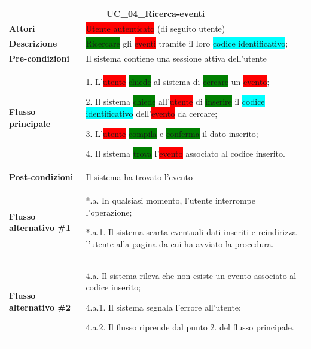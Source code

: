 \documentclass[11pt]{article}
\begin{document}
\begin{table}[H]
\centering
\begin{tabularx}{1\textwidth}{|l|X|}
\hline
\multicolumn{2}{|c|}{\textbf{UC\_04\_Ricerca-eventi}}\\
\hline \textbf{Attori} & \colorbox{red}{Utente autenticato} (di seguito utente)\\
\hline \textbf{Descrizione} & \colorbox{green}{Ricercare} gli \colorbox{red}{eventi} tramite il loro \colorbox{cyan}{codice identificativo};\\
\hline \textbf{Pre-condizioni} & Il sistema contiene una sessione attiva dell'utente\\
\hline \textbf{Flusso principale} & 
1. L'\colorbox{red}{utente} \colorbox{green}{chiede} al sistema di \colorbox{green}{cercare} un \colorbox{red}{evento};

2. Il sistema \colorbox{green}{chiede} all'\colorbox{red}{utente} di \colorbox{green}{inserire} il \colorbox{cyan}{codice identificativo} dell'\colorbox{red}{evento} da cercare;

3. L'\colorbox{red}{utente} \colorbox{green}{compila} e \colorbox{green}{conferma} il dato inserito;

4. Il sistema \colorbox{green}{trova} l'\colorbox{red}{evento} associato al codice inserito.
\\
\hline \textbf{Post-condizioni} & Il sistema ha trovato l'evento\\
\hline \textbf{Flusso alternativo \#1} & 
*.a. In qualsiasi momento, l'utente interrompe l'operazione;

*.a.1. Il sistema scarta eventuali dati inseriti e reindirizza l'utente alla pagina
da cui ha avviato la procedura.
\\
\hline \textbf{Flusso alternativo \#2} & 
4.a. Il sistema rileva che non esiste un evento associato al codice inserito;

4.a.1. Il sistema segnala l'errore all'utente;

4.a.2. Il flusso riprende dal punto 2. del flusso principale.
\\
\hline
\end{tabularx}
\end{table}
\end{document}
